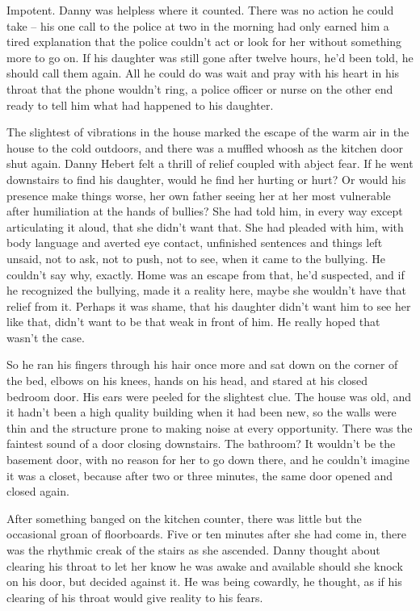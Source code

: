 Impotent.  Danny was helpless where it counted.  There was no action he could take – his one call to the police at two in the morning had only earned him a tired explanation that the police couldn't act or look for her without something more to go on.  If his daughter was still gone after twelve hours, he'd been told, he should call them again.  All he could do was wait and pray with his heart in his throat that the phone wouldn't ring, a police officer or nurse on the other end ready to tell him what had happened to his daughter.



The slightest of vibrations in the house marked the escape of the warm air in the house to the cold outdoors, and there was a muffled whoosh as the kitchen door shut again.  Danny Hebert felt a thrill of relief coupled with abject fear.  If he went downstairs to find his daughter, would he find her hurting or hurt?  Or would his presence make things worse, her own father seeing her at her most vulnerable after humiliation at the hands of bullies?  She had told him, in every way except articulating it aloud, that she didn't want that.  She had pleaded with him, with body language and averted eye contact, unfinished sentences and things left unsaid, not to ask, not to push, not to see, when it came to the bullying.  He couldn't say why, exactly.  Home was an escape from that, he'd suspected, and if he recognized the bullying, made it a reality here, maybe she wouldn't have that relief from it.  Perhaps it was shame, that his daughter didn't want him to see her like that, didn't want to be that weak in front of him.  He really hoped that wasn't the case.



So he ran his fingers through his hair once more and sat down on the corner of the bed, elbows on his knees, hands on his head, and stared at his closed bedroom door.  His ears were peeled for the slightest clue.  The house was old, and it hadn't been a high quality building when it had been new, so the walls were thin and the structure prone to making noise at every opportunity.  There was the faintest sound of a door closing downstairs.  The bathroom?  It wouldn't be the basement door, with no reason for her to go down there, and he couldn't imagine it was a closet, because after two or three minutes, the same door opened and closed again.



After something banged on the kitchen counter, there was little but the occasional groan of floorboards.  Five or ten minutes after she had come in, there was the rhythmic creak of the stairs as she ascended.  Danny thought about clearing his throat to let her know he was awake and available should she knock on his door, but decided against it.  He was being cowardly, he thought, as if his clearing of his throat would give reality to his fears.



